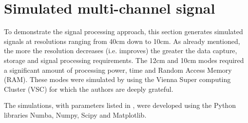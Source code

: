 \section{Simulated multi-channel signal}
\label{sc:mysimulation}
To demonstrate the signal processing approach, this section generates simulated signals at resolutions ranging from 40cm down to 10cm. As already mentioned, the more the resolution decreases (i.e. improves) the greater the data capture, storage and signal processing requirements. The 12cm and 10cm modes required a significant amount of processing power, time and Random Access Memory (RAM). These modes were simulated by using the Vienna Super computing Cluster (VSC) for which the authors are deeply grateful. 
\par
The simulations, with parameters listed in , were developed using the Python libraries Numba, Numpy, Scipy and Matplotlib.

